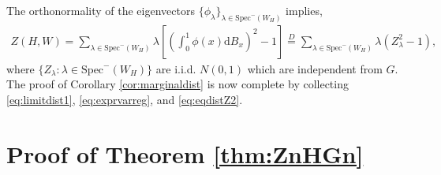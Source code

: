 \documentclass[11pt,reqno]{amsart}
\numberwithin{equation}{section}
\newcommand{\Spec}{\mathrm{Spec}}
\theoremstyle{definition}
\begin{document}
The orthonormality of the eigenvectors $\{\phi_{\lambda}\}_{\lambda\in \Spec^{-}(W_H)}$ implies,
\begin{align}\label{eq:eqdistZ2}
    Z(H,W) = \sum_{\lambda\in\Spec^{-}(W_H)}\lambda \left[\left(\int_{0}^{1}\phi(x)\mathrm{d}B_{x}\right)^2-1\right]\overset{D}{=} \sum_{\lambda\in \Spec^{-}(W_H)}\lambda(Z_\lambda^2-1) , 
\end{align}
where $\{Z_\lambda:\lambda\in \Spec^{-}(W_H)\}$ are i.i.d. $N(0,1)$ which are independent from $G$. The proof of Corollary \ref{cor:marginaldist} is now complete by collecting \eqref{eq:limitdist1}, \eqref{eq:exprvarreg}, and \eqref{eq:eqdistZ2}.



\section{Proof of Theorem \ref{thm:ZnHGn}} 
\label{sec:limitWGnpf}
\end{document}
